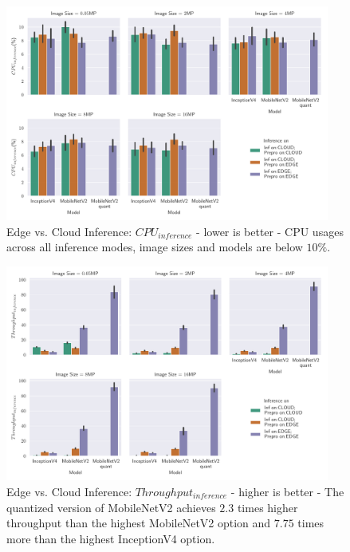 \begin{figure}[!htb]
\centering
\includegraphics[width=0.95\textwidth]{./Bilder/single_plots/edge_vs_cloud_plots/Edge_vs_Cloud_Inference_Inference_CPU.pdf}
\caption[Edge vs. Cloud Inference:  $CPU_{inference}$ - lower is better]{Edge vs. Cloud Inference:  $CPU_{inference}$ - lower is better -
CPU usages across all inference modes, image sizes and models are below $10\%$.}
\label{fig:EdgeVsCloudInferenceCPU}
\end{figure}


\begin{figure}[!htb]
\centering
\includegraphics[width=0.95\textwidth]{./Bilder/single_plots/edge_vs_cloud_plots/Edge_vs_Cloud_Inference_Throughput_without_Preprocessing.pdf}
\caption[Edge vs. Cloud Inference:  $Throughput_{inference}$ - higher is better]{Edge vs. Cloud Inference:  $Throughput_{inference}$ - higher is better -
The quantized version of MobileNetV2 achieves $2.3$ times higher throughput than the highest MobileNetV2 option and $7.75$ times more than the highest InceptionV4 option.}
\label{fig:EdgeVsCloudinferneceThroughput}
\end{figure}

